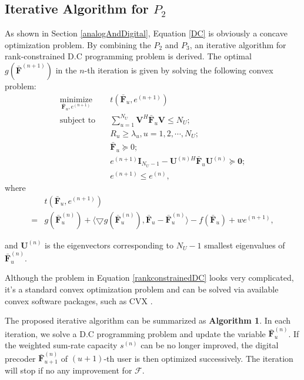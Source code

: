 \documentclass[10pt,journal,twocolumn,twoside]{IEEEtran}
\begin{document}
\subsection{Iterative Algorithm for $P_2$}
As shown in Section \ref{analogAndDigital}, Equation \eqref{DC} is obviously a concave optimization problem.
By combining the $P_2$ and $P_3$, an iterative algorithm for rank-constrained D.C programming problem is derived. 
The optimal $g(\bar{\bm{F}}^{(n+1)})$ in the $n$-th iteration is given by solving the following convex problem:
\begin{align} \label{rankconstrainedDC}
\underset{\bar{\bm{F}}_u, e^{(n+1)}}{\text{minimize}}  & \quad  t(\bar{\bm{F}}_u, e^{(n+1)}) \\
\text{subject to}&\quad \sum_{u=1}^{N_U}\bm{V}^H \bar{\bm{F}}_u\bm{V} \leq N_U;\nonumber\\
& \quad R_{u}\geq \lambda_{u}, u = 1,2,\cdots, N_U;\nonumber\\
&\quad \bar{\bm{F}}_u \succeq 0;\nonumber\\
&\quad e^{(n+1)}\bm{I}_{N_U-1} - \bm{U}^{(n)H} \bar{\bm{F}}_u \bm{U}^{(n)} \succeq \bm{0};\nonumber\\
&\quad e^{(n+1)} \leq e^{(n)},\nonumber 
\end{align}
where
\begin{align}
 &t(\bar{\bm{F}}_u, e^{(n+1)})\nonumber\\
  = &g(\bar{\bm{F}}^{(n)}_u) + \langle \bigtriangledown g(\bar{\bm{F}}^{(n)}_u), \bar{\bm{F}}_u -  \bar{\bm{F}}_u^{(n)} \rangle  -  f(\bar{\bm{F}}_u) + w e^{(n+1)},\nonumber
\end{align}

 and $\bm{U}^{(n)}$ is the eigenvectors corresponding to $N_U-1$ smallest eigenvalues of  $\bar{\bm{F}}^{(n)}_u$.

Although the problem in Equation \eqref{rankconstrainedDC} looks very complicated, it's a standard convex optimization problem and can be solved via available convex software packages, such as CVX \cite{cvx}.

The proposed iterative algorithm can be summarized as \textbf{Algorithm 1}. In each iteration, we solve a D.C programming problem and update the variable $\bar{\bm{F}}^{(n)}_u$. If the weighted sum-rate capacity $s^{(n)}$ can be no longer improved, the digital precoder $\bar{\bm{F}}^{(n)}_{u+1}$ of $(u+1)$-th user is then optimized successively. The iteration will stop if no any improvement for $\bm{\mathcal{F}}$.
\end{document}
